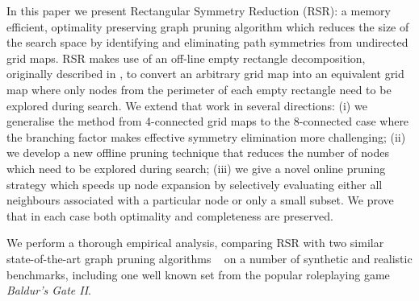 %
\par
In this paper we present Rectangular Symmetry Reduction (RSR): a
memory efficient, optimality preserving graph pruning algorithm which reduces
the size of the search space by identifying and eliminating path symmetries from
undirected grid maps.
RSR makes use of an off-line empty rectangle decomposition, originally described in
\cite{harabor10}, to convert an arbitrary grid map into an equivalent grid map where only nodes from the 
perimeter of each empty rectangle need to be explored during search.
We extend that work in several directions: (i) we generalise the method from
4-connected grid maps to the 8-connected case where the branching factor makes
effective symmetry elimination more challenging;
(ii) we develop a new offline pruning technique that reduces the number of nodes which
need to be explored during search;
(iii) we give a novel online pruning strategy which speeds up node expansion by selectively 
evaluating either all neighbours associated with a particular node or only a small subset.
We prove that in each case both optimality and completeness are preserved.
\par
We perform a thorough empirical analysis, comparing RSR with two similar
state-of-the-art graph pruning algorithms ~\cite{pochter10,harabor10}
on a number of synthetic and realistic benchmarks, including one well known set 
from the popular roleplaying game \emph{Baldur's Gate II}.
